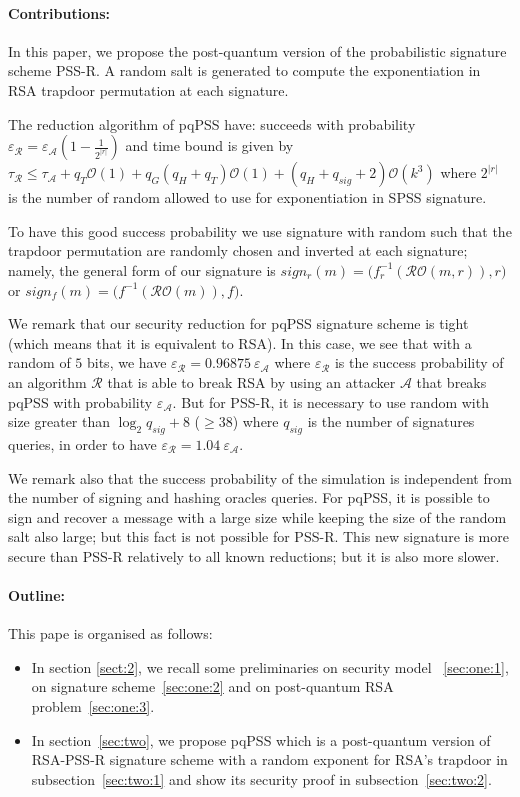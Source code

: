 \documentclass[a4paper,11pt]{article}
\begin{document}
\paragraph{Contributions:}
In this paper, we propose the post-quantum version of the probabilistic signature scheme PSS-R.  A random salt is generated to compute the exponentiation in RSA trapdoor permutation at each signature.


The reduction algorithm of pqPSS have: succeeds with probability $\varepsilon_{\mathcal{R}} =\varepsilon_{\mathcal{A}}(1-\frac{1}{2^{|r|}})$ and time bound is given by $\tau_{\mathcal{R}}\leq \tau_{\mathcal{A}} + q_{T}\mathcal{O}(1) + q_{G}(q_{H}+q_{T})\mathcal{O}(1)+ (q_{H}+q_{sig}+2)\mathcal{O}(k^{3})$ where $2^{|r|}$ is the number of random allowed to use for exponentiation in SPSS signature.


To have this good success probability we use signature with random such that the trapdoor permutation are randomly chosen and inverted at each signature; namely, the general form of our signature is  $sign_{r}(m)=\big(f_{r}^{-1}(\mathcal{RO}(m, r)), r\big)$ or $sign_{f}(m)=\big(f^{-1}(\mathcal{RO}(m)), f\big)$.


We remark that our  security reduction for pqPSS signature scheme is tight (which means that it is equivalent  to RSA). In this case, we see that with a random of $5$ bits, we have $\varepsilon_{\mathcal{R}}=0.96875 \ \varepsilon_{\mathcal{A}}$ where $\varepsilon_{\mathcal{R}}$  is the success probability of an algorithm $\mathcal{R}$ that is able to break RSA by using an attacker $\mathcal{A}$ that breaks pqPSS with probability $\varepsilon_{\mathcal{A}}$. But for PSS-R, it is necessary to use  random with size greater than $\log_{2}q_{sig}+8$ ($\geq 38$) where $q_{sig}$ is the number of signatures queries, in order to have $\varepsilon_{\mathcal{R}}=1.04 \ \varepsilon_{\mathcal{A}}$.

We remark also that the success  probability of the simulation is independent from the number of signing and hashing oracles queries. For pqPSS, it is possible to sign and recover a message with a large size while keeping the size of the random salt also large; but this fact is not possible for PSS-R. This new signature is more secure than PSS-R relatively to all known reductions; but it is also more slower.

\paragraph{Outline:} This pape is organised as follows:
\begin{itemize}
\item In section \ref{sect:2}, we recall some preliminaries on security model ~\ref{sec:one:1}, on signature scheme~\ref{sec:one:2} and on post-quantum RSA problem~\ref{sec:one:3}.
\item In section~\ref{sec:two}, we propose pqPSS which is a post-quantum version of RSA-PSS-R signature scheme with a random exponent for RSA's trapdoor in subsection~\ref{sec:two:1} and show its security proof in subsection~\ref{sec:two:2}.
\end{itemize}
\end{document}
